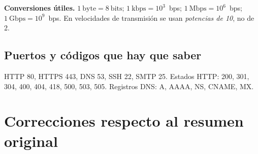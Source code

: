 \documentclass[11pt,a4paper]{article}
\begin{document}
\textbf{Conversiones útiles.} $1~\text{byte}=8~\text{bits}$; $1~\text{kbps}=10^{3}$~bps; $1~\text{Mbps}=10^{6}$~bps; $1~\text{Gbps}=10^{9}$~bps. En velocidades de transmisión se usan \emph{potencias de 10}, no de 2.

\subsection*{Puertos y códigos que hay que saber}
HTTP 80, HTTPS 443, DNS 53, SSH 22, SMTP 25. Estados HTTP: 200, 301, 304, 400, 404, 418, 500, 503, 505. Registros DNS: A, AAAA, NS, CNAME, MX.

\section{Correcciones respecto al resumen original}
\end{document}

